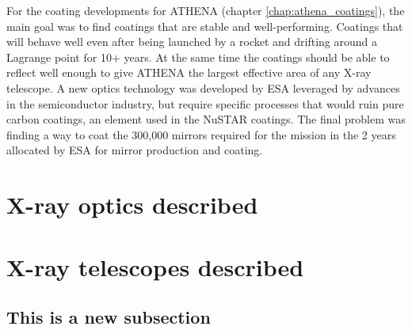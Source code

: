 For the coating developments for ATHENA (chapter \ref{chap:athena_coatings}), the main goal was to find coatings that are stable and well-performing. Coatings that will behave well even after being launched by a rocket and drifting around a Lagrange point for 10+ years. At the same time the coatings should be able to reflect well enough to give ATHENA the largest effective area of any X-ray telescope. A new optics technology was developed by ESA leveraged by advances in the semiconductor industry, but require specific processes that would ruin pure carbon coatings, an element used in the NuSTAR coatings. The final problem was finding a way to coat the 300,000 mirrors required for the mission in the 2 years allocated by ESA for mirror production and coating.

\section{X-ray optics described}
\section{X-ray telescopes described}
\subsection{This is a new subsection}
